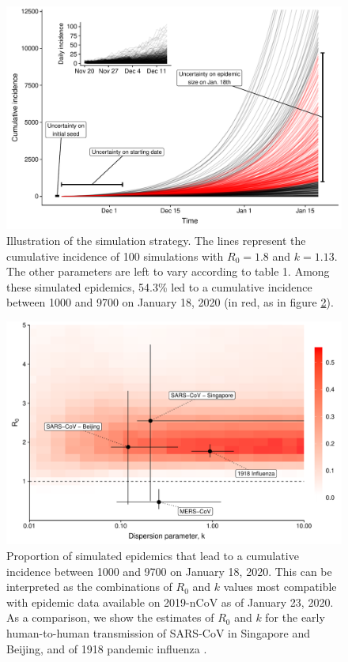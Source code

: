 \documentclass[a4]{article}
\begin{document}
\begin{figure}[t]
	\centering
	\includegraphics[width=.9\linewidth]{../figure/fig3b.pdf}
	\caption{Illustration of the simulation strategy. The lines represent the cumulative incidence of 100 simulations with $R_0=1.8$ and $k=1.13$. The other parameters are left to vary according to table 1. Among these simulated epidemics, 54.3\% led to a cumulative incidence between 1000 and 9700 on January 18, 2020 (in red, as in figure \ref{fig:fig1}).}
	\label{fig:fig3}
\end{figure}


\begin{figure}[t]
	\centering
	\includegraphics[width=.9\linewidth]{../figure/fig1.pdf}
	\caption{Proportion of simulated epidemics that lead to a cumulative incidence between 1000 and 9700 on January 18, 2020. This can be interpreted as the combinations of $R_0$ and $k$ values most compatible with epidemic data available on 2019-nCoV as of January 23, 2020. As a comparison, we show the estimates of $R_0$ and $k$ for the early human-to-human transmission of SARS-CoV in Singapore and Beijing, and of 1918 pandemic influenza \cite{Lloyd-Smith:2005,Fraser:2011,Kucharski:2015b}.
	}
	\label{fig:fig1}
\end{figure}
\end{document}
